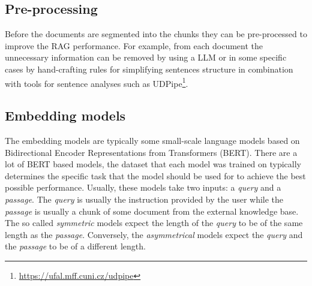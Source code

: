 \subsection{Pre-processing}

Before the documents are segmented into the chunks they can be pre-processed to improve the RAG performance. For example, from each document the unnecessary information can be removed by using a LLM or in some specific cases by hand-crafting rules for simplifying sentences structure in combination with tools for sentence analyses such as UDPipe\footnote{\url{https://ufal.mff.cuni.cz/udpipe}}.


\subsection{Embedding models}

The embedding models are typically some small-scale language models based on Bidirectional Encoder Representations from Transformers (BERT). There are a lot of BERT based models, the dataset that each model was trained on typically determines the specific task that the model should be used for to achieve the best possible performance. Usually, these models take two inputs: a \textit{query} and a \textit{passage}. The \textit{query} is usually the instruction provided by the user while the \textit{passage} is usually a chunk of some document from the external knowledge base. The so called \textit{symmetric} models expect the length of the \textit{query} to be of the same length as the \textit{passage}. Conversely, the \textit{asymmetrical} models expect the \textit{query} and the \textit{passage} to be of a different length.